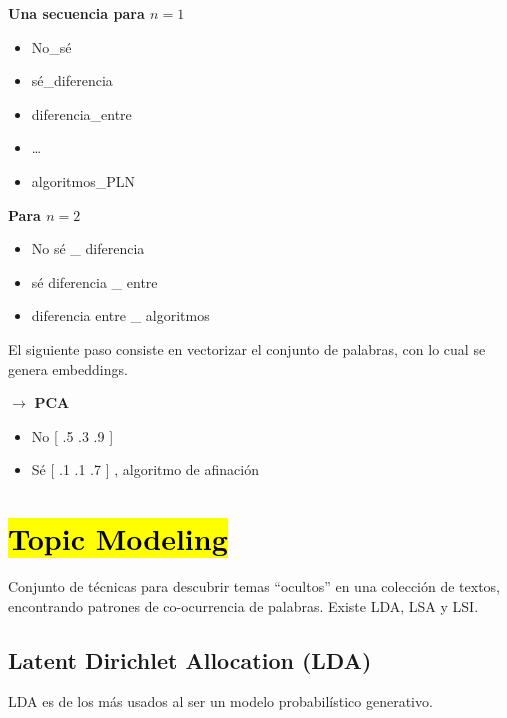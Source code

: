 \documentclass[12pt]{article}
\begin{document}
\begin{minipage}[t]{0.45\textwidth}
    \textbf{Una secuencia para $n=1$}
    \begin{itemize}
        \item No\_sé
        \item sé\_diferencia
        \item diferencia\_entre
        \item \dots
        \item algoritmos\_PLN
    \end{itemize}
\end{minipage}
\hfill
\begin{minipage}[t]{0.45\textwidth}
    \textbf{Para $n=2$}
    \begin{itemize}
        \item No sé \_ diferencia
        \item sé diferencia \_ entre
        \item diferencia entre \_ algoritmos
    \end{itemize}
\end{minipage}

\vspace{2em}

El siguiente paso consiste en vectorizar el conjunto de palabras, con lo cual se genera embeddings.

\vspace{1.5em}

$\rightarrow$ \textbf{PCA}

\begin{itemize}
    \item No [ .5 \quad .3 \quad .9 ]
    \item Sé [ .1 \quad .1 \quad .7 ] , algoritmo de afinación
\end{itemize}


\section*{\hl{Topic Modeling}}

Conjunto de técnicas para descubrir temas ``ocultos'' en una colección de textos, encontrando patrones de co-ocurrencia de palabras. Existe LDA, LSA y LSI.

\subsection*{Latent Dirichlet Allocation (LDA)}
LDA es de los más usados al ser un modelo probabilístico generativo.
\end{document}

